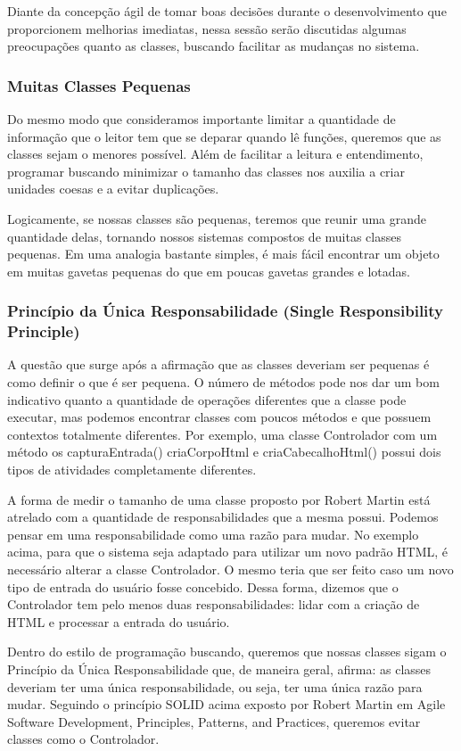 Diante da concepção ágil de tomar boas decisões durante o desenvolvimento que proporcionem melhorias imediatas, nessa sessão serão discutidas algumas preocupações quanto as classes, buscando facilitar as mudanças no sistema.

\subsubsection{Muitas Classes Pequenas}
Do mesmo modo que consideramos importante limitar a quantidade de informação que o leitor tem que se deparar quando lê funções, queremos que as classes sejam o menores possível. Além de facilitar a leitura e entendimento, programar buscando minimizar o tamanho das classes nos auxilia a criar unidades coesas e a evitar duplicações. 
	
Logicamente, se nossas classes são pequenas, teremos que reunir uma grande quantidade delas, tornando nossos sistemas compostos de muitas classes pequenas. Em uma analogia bastante simples, é mais fácil encontrar um objeto em muitas gavetas pequenas do que em poucas gavetas grandes e lotadas.

\subsubsection{Princípio da Única Responsabilidade (Single Responsibility Principle)}
A questão que surge após a afirmação que as classes deveriam ser pequenas é como definir o que é ser pequena. O número de métodos pode nos dar um bom indicativo quanto a quantidade de operações diferentes que a classe pode executar, mas podemos encontrar classes com poucos métodos e que possuem contextos totalmente diferentes. Por exemplo, uma classe Controlador com um método os capturaEntrada() criaCorpoHtml e criaCabecalhoHtml() possui dois tipos de atividades completamente diferentes.
	
A forma de medir o tamanho de uma classe proposto por Robert Martin está atrelado com a quantidade de responsabilidades que a mesma possui. Podemos pensar em uma responsabilidade como uma razão para mudar. No exemplo acima, para que o sistema seja adaptado para utilizar um novo padrão HTML, é necessário alterar a classe Controlador. O mesmo teria que ser feito caso um novo tipo de entrada do usuário fosse concebido. Dessa forma, dizemos que o Controlador tem pelo menos duas responsabilidades: lidar com a criação de HTML e processar a entrada do usuário.
	
Dentro do estilo de programação buscando, queremos que nossas classes sigam o Princípio da Única Responsabilidade que, de maneira geral, afirma: as classes deveriam ter uma única responsabilidade, ou seja, ter uma única razão para mudar. Seguindo o princípio SOLID acima exposto por Robert Martin em Agile Software Development, Principles, Patterns, and Practices, queremos evitar classes como o Controlador.

